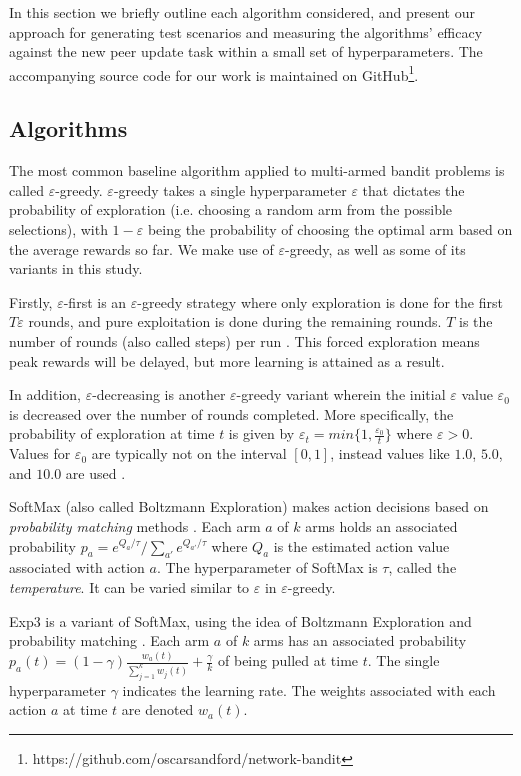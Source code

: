 \documentclass{article}
\begin{document}
In this section we briefly outline each algorithm considered, and present our approach for generating test scenarios and measuring the algorithms' efficacy against the 
new peer update task within a small set of hyperparameters. The accompanying source code for our work is maintained on 
GitHub\footnote{https://github.com/oscarsandford/network-bandit}.

\subsection{Algorithms} \label{sec:algos}

The most common baseline algorithm applied to multi-armed bandit problems is called $\varepsilon$-greedy. $\varepsilon$-greedy takes a single hyperparameter $\varepsilon$ 
that dictates the probability of exploration (i.e. choosing a random arm from the possible selections), with $1-\varepsilon$ being the probability of choosing the optimal 
arm based on the average rewards so far. We make use of $\varepsilon$-greedy, as well as some of its variants in this study. 

Firstly, $\varepsilon$-first is an $\varepsilon$-greedy strategy where only exploration is done for the first $T\varepsilon$ rounds, and pure exploitation 
is done during the remaining rounds. $T$ is the number of rounds (also called steps) per run \cite{mab_algos}. This forced exploration means peak rewards will be delayed, 
but more learning is attained as a result.

In addition, $\varepsilon$-decreasing is another $\varepsilon$-greedy variant wherein the initial $\varepsilon$ value $\varepsilon_0$ is decreased over the number of rounds 
completed. More specifically, the probability of exploration at time $t$ is given by $\varepsilon_t = min\{ 1, \frac{\varepsilon_0}{t}\}$ where $\varepsilon > 0$. Values for 
$\varepsilon_0$ are typically not on the interval $[0,1]$, instead values like $1.0$, $5.0$, and $10.0$ are used \cite{mab_algos}.

SoftMax (also called Boltzmann Exploration) makes action decisions based on \emph{probability matching} methods \cite{mab_algos}. Each arm $a$ of $k$ arms holds an associated 
probability $p_a = e^{Q_a/\tau}/\sum_{a'}e^{Q_{a'}/\tau}$ where $Q_a$ is the estimated action value associated with action $a$. The hyperparameter of SoftMax is $\tau$, 
called the \emph{temperature}. It can be varied similar to $\varepsilon$ in $\varepsilon$-greedy.

Exp3 is a variant of SoftMax, using the idea of Boltzmann Exploration and probability matching \cite{mab_algos}. Each arm $a$ of $k$ arms has an associated probability 
$p_a(t) = (1-\gamma) \frac{w_a(t)}{\sum_{j=1}^k w_j(t)} + \frac{\gamma}{k}$ of being pulled at time $t$. The single hyperparameter $\gamma$ indicates the learning 
rate. The weights associated with each action $a$ at time $t$ are denoted $w_a(t)$.
\end{document}
